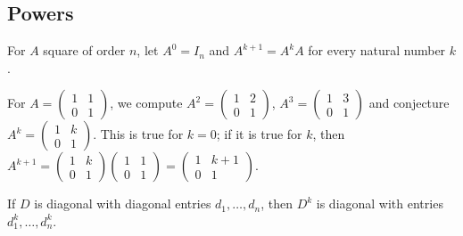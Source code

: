 \subsection{Powers}
\begin{definition}
For $A$ square of order $n$, let $A^0=I_n$ and $A^{k+1}=A^kA$ for every natural number $k$.
\end{definition}
\begin{method}
For $A=\begin{pmatrix}1&1\\0&1\end{pmatrix}$, we compute $A^2=\begin{pmatrix}1&2\\0&1\end{pmatrix}$, $A^3=\begin{pmatrix}1&3\\0&1\end{pmatrix}$ and conjecture $A^k=\begin{pmatrix}1&k\\0&1\end{pmatrix}$. This is true for $k=0$; if it is true for $k$, then $A^{k+1}=\begin{pmatrix}1&k\\0&1\end{pmatrix}\begin{pmatrix}1&1\\0&1\end{pmatrix}=\begin{pmatrix}1&k+1\\0&1\end{pmatrix}$.
\end{method}
\begin{keypoint}
If $D$ is diagonal with diagonal entries $d_1,\dots,d_n$, then $D^k$ is diagonal with entries $d_1^k,\dots,d_n^k$.
\end{keypoint}

